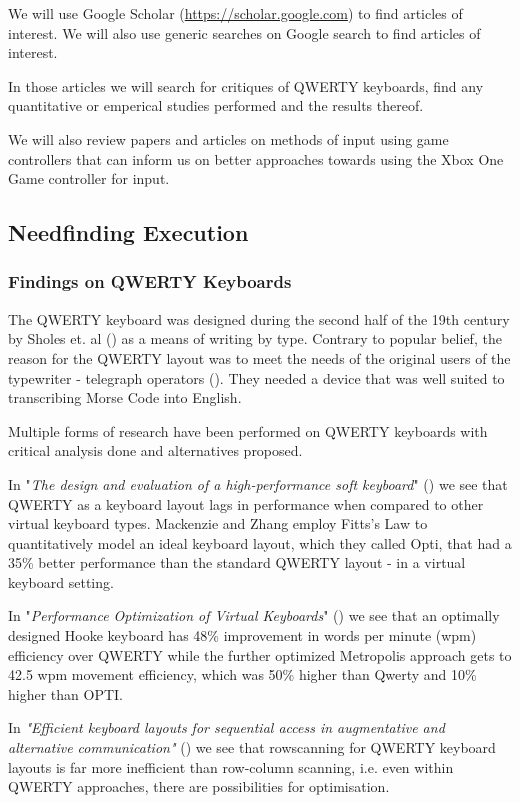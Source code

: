 \documentclass[
	letterpaper, %
]{jdf}
\begin{document}
We will use Google Scholar (\url{https://scholar.google.com}) to find articles of interest. We will also use generic searches on Google search to find articles of interest.

In those articles we will search for critiques of QWERTY keyboards, find any quantitative or emperical studies performed and the results thereof.

We will also review papers and articles on methods of input using game controllers that can inform us on better approaches towards using the Xbox One Game controller for input.

\subsection{Needfinding Execution}
\subsubsection{Findings on QWERTY Keyboards}
The QWERTY keyboard was designed during the second half of the 19th century by Sholes et. al (\cite{sholes_glidden_soule_1868}) as a means of writing by type. Contrary to popular belief, the reason for the QWERTY layout was to meet the needs of the original users of the typewriter - telegraph operators (\cite{stamp_2013}). They needed a device that was well suited to transcribing Morse Code into English. 

Multiple forms of research have been performed on QWERTY keyboards with critical analysis done and alternatives proposed. 

In "\textit{The design and evaluation of a high-performance soft keyboard}" (\cite{mackenzie_zhang_1999}) we see that QWERTY as a keyboard layout lags in performance when compared to other virtual keyboard types. Mackenzie and Zhang employ Fitts's Law to quantitatively model an ideal keyboard layout, which they called Opti, that had a 35\% better performance than the standard QWERTY layout - in a virtual keyboard setting.

In "\textit{Performance Optimization of Virtual Keyboards}" (\cite{zhai_hunter_smith_2002}) we see that an optimally designed Hooke keyboard has 48\% improvement in words per minute (wpm) efficiency over QWERTY while the further optimized Metropolis approach gets to 42.5 wpm movement efficiency, which was 50\% higher than Qwerty and 10\% higher than OPTI.

In \textit{"Efficient keyboard layouts for sequential access in augmentative and alternative communication"} (\cite{venkatagiri_1999}) we see that rowscanning for QWERTY keyboard layouts is far more inefficient than row-column scanning, i.e. even within QWERTY approaches, there are possibilities for optimisation.
\end{document}
